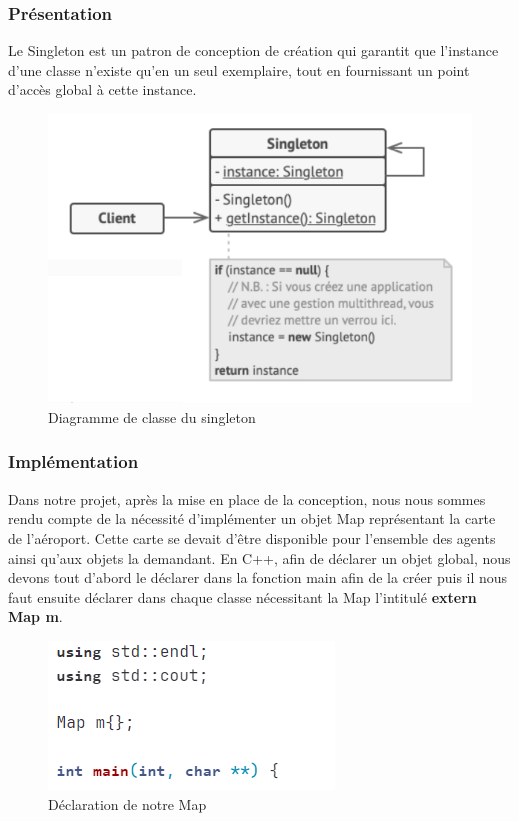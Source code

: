 \documentclass[12pt,french]{article} %
\begin{document}
\subsubsection{Présentation}

Le Singleton est un patron de conception de création qui garantit que l’instance d’une classe n’existe qu’en un seul exemplaire, tout en fournissant un point d’accès global à cette instance.

\begin{figure}[H]
	\centering
	\includegraphics[scale=0.5]{single.png}
	\caption{Diagramme de classe du singleton}    
\end{figure}

\subsubsection{Implémentation}

Dans notre projet, après la mise en place de la conception, nous nous sommes rendu compte de la nécessité d'implémenter un objet Map représentant la carte de l'aéroport. Cette carte se devait d'être disponible pour l'ensemble des agents ainsi qu'aux objets la demandant. En C++, afin de déclarer un objet global, nous devons tout d'abord le déclarer dans la fonction main afin de la créer puis il nous faut ensuite déclarer dans chaque classe nécessitant la Map l'intitulé \textbf{extern Map m}.

\begin{figure}[H]
	\centering
	\includegraphics[scale=1]{map.png}
	\caption{Déclaration de notre Map}    
\end{figure}
\end{document}
